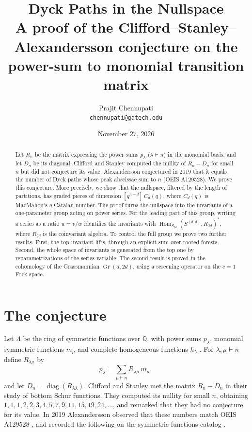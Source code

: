 \documentclass[11pt]{article}
\title{Dyck Paths in the Nullspace\\[0.4em]\large A proof of the Clifford--Stanley--Alexandersson conjecture on the
power-sum to monomial transition matrix}
\author{Prajit Chennupati\\ \small\texttt{chennupati@gatech.edu}}
\date{November 27, 2026}
\theoremstyle{definition}
\theoremstyle{remark}
\newcommand{\Q}{\mathbb{Q}}
\newcommand{\La}{\Lambda}
\newcommand{\Hom}{\operatorname{Hom}}
\newcommand{\Gr}{\operatorname{Gr}}
\begin{document}
\maketitle
\begin{abstract}
Let $R_n$ be the matrix expressing the power sums $p_\lambda$ ($\lambda\vdash n$) in the monomial basis, and let
$D_n$ be its diagonal. Clifford and Stanley computed the nullity of $R_n-D_n$ for small $n$ but did not conjecture
its value. Alexandersson conjectured in 2019 that it equals the number of Dyck paths whose peak abscissae sum
to $n$ (OEIS A129528). We prove this conjecture. More precisely, we show that the nullspace, filtered by the
length of partitions, has graded pieces of dimension $[q^{n-d}]\,C_d(q)$, where $C_d(q)$ is MacMahon's
$q$-Catalan number. The proof turns the nullspace into the invariants of a one-parameter group acting on power series.
For the leading part of this group, writing a series as a ratio $u=v/w$ identifies the invariants with
$\Hom_{S_{2d}}(S^{(d,d)},R_{2d})^*$, where $R_{2d}$ is the coinvariant algebra. To control the full group we
prove two further results. First, the top invariant lifts, through an explicit sum over rooted forests. Second,
the whole space of invariants is generated from the top one by reparametrizations of the series variable. The
second result is proved in the cohomology of the Grassmannian $\Gr(d,2d)$, using a screening operator on the
$c=1$ Fock space.
\end{abstract}

\section{The conjecture}

Let $\La$ be the ring of symmetric functions over $\Q$, with power sums $p_\lambda$, monomial symmetric functions
$m_\mu$ and complete homogeneous functions $h_\lambda$ \cite{Mac}. For $\lambda,\mu\vdash n$ define $R_{\lambda\mu}$ by
\[
  p_\lambda=\sum_{\mu\vdash n}R_{\lambda\mu}\,m_\mu ,
\]
and let $D_n=\operatorname{diag}(R_{\lambda\lambda})$. Clifford and Stanley \cite{CS04} met the matrix $R_n-D_n$ in their study of
bottom Schur functions. They computed its nullity for small $n$, obtaining
$1,\allowbreak1,\allowbreak1,\allowbreak2,\allowbreak2,\allowbreak3,\allowbreak4,\allowbreak5,\allowbreak7,\allowbreak9,\allowbreak11,\allowbreak15,\allowbreak19,\allowbreak24,\allowbreak\dots$, and remarked that they had no conjecture for its value. In 2019
Alexandersson observed that these numbers match OEIS A129528 \cite{OEIS}, and recorded the following on the
symmetric functions catalog \cite{SymCat}.
\end{document}
